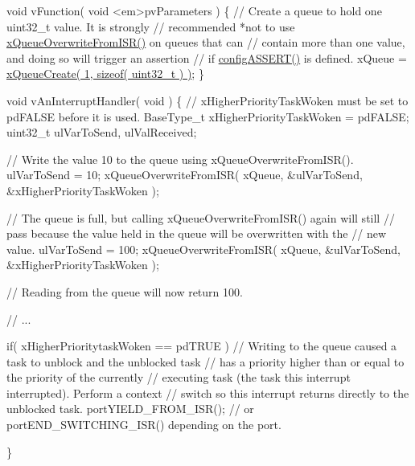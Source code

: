 \begin{DoxyPre} void vFunction( void <em>pvParameters )
 \{
    // Create a queue to hold one uint32\_t value.  It is strongly
    // recommended *not to use \hyperlink{vendor_2ceedling_2plugins_2freertos_2src_2freertos_2include_2queue_8h_abdcd6a86ef82034d002193e79cfd3ce8}{xQueueOverwriteFromISR()} on queues that can
    // contain more than one value, and doing so will trigger an assertion
    // if \hyperlink{externals_2freertos_2include_2_free_r_t_o_s_8h_a228c70cd48927d6ab730ed1a6dfbe35f}{configASSERT()} is defined.
    xQueue = \hyperlink{vendor_2ceedling_2plugins_2freertos_2src_2freertos_2include_2queue_8h_aeb858b824bd74a934ea7ebb81af2a6bb}{xQueueCreate( 1, sizeof( uint32\_t ) )};
\}\end{DoxyPre}



\begin{DoxyPre}void vAnInterruptHandler( void )
\{
// xHigherPriorityTaskWoken must be set to pdFALSE before it is used.
BaseType\_t xHigherPriorityTaskWoken = pdFALSE;
uint32\_t ulVarToSend, ulValReceived;
\begin{DoxyVerb}// Write the value 10 to the queue using xQueueOverwriteFromISR().
ulVarToSend = 10;
xQueueOverwriteFromISR( xQueue, &ulVarToSend, &xHigherPriorityTaskWoken );

// The queue is full, but calling xQueueOverwriteFromISR() again will still
// pass because the value held in the queue will be overwritten with the
// new value.
ulVarToSend = 100;
xQueueOverwriteFromISR( xQueue, &ulVarToSend, &xHigherPriorityTaskWoken );

// Reading from the queue will now return 100.

// ...

if( xHigherPrioritytaskWoken == pdTRUE )
{
    // Writing to the queue caused a task to unblock and the unblocked task
    // has a priority higher than or equal to the priority of the currently
    // executing task (the task this interrupt interrupted).  Perform a context
    // switch so this interrupt returns directly to the unblocked task.
    portYIELD_FROM_ISR(); // or portEND_SWITCHING_ISR() depending on the port.
}
\end{DoxyVerb}

\}
 \end{DoxyPre}
 